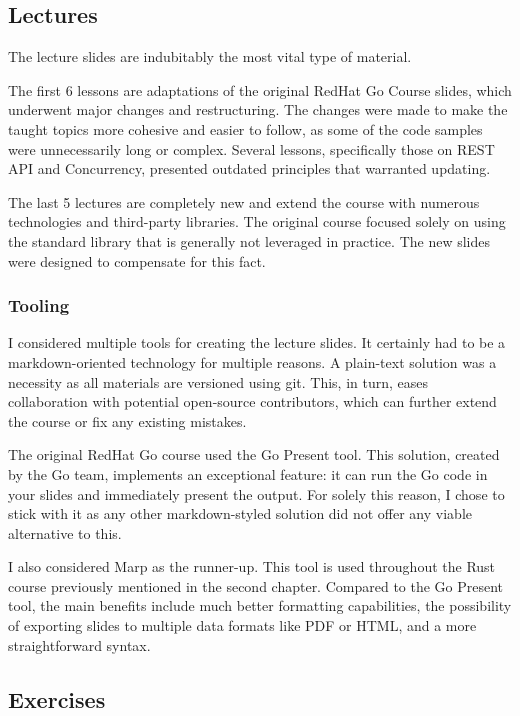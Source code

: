 \documentclass[
  digital,
  color,
  oneside,
  nosansbold,
  nocolorbold,
  lof,
  lot,
]{fithesis4}
\begin{document}
\subsection{Lectures}

The lecture slides are indubitably the most vital type of material. 

The first 6 lessons are adaptations of the original RedHat Go Course slides, which underwent major changes and restructuring. The changes were made to make the taught topics more cohesive and easier to follow, as some of the code samples were unnecessarily long or complex. Several lessons, specifically those on REST API and Concurrency, presented outdated principles that warranted updating.

The last 5 lectures are completely new and extend the course with numerous technologies and third-party libraries. The original course focused solely on using the standard library that is generally not leveraged in practice. The new slides were designed to compensate for this fact.

\subsubsection{Tooling}

I considered multiple tools for creating the lecture slides. It certainly had to be a markdown-oriented technology for multiple reasons. A plain-text solution was a necessity as all materials are versioned using git. This, in turn, eases collaboration with potential open-source contributors, which can further extend the course or fix any existing mistakes.

The original RedHat Go course used the Go Present tool. This solution, created by the Go team, implements an exceptional feature: it can run the Go code in your slides and immediately present the output. For solely this reason, I chose to stick with it as any other markdown-styled solution did not offer any viable alternative to this.

I also considered Marp as the runner-up. This tool is used throughout the Rust course previously mentioned in the second chapter. Compared to the Go Present tool, the main benefits include much better formatting capabilities, the possibility of exporting slides to multiple data formats like PDF or HTML, and a more straightforward syntax.

\subsection{Exercises}
\end{document}
